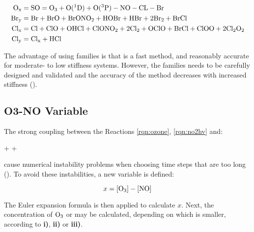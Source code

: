 \begin{align*}
    \mathrm{O_x} & = \mathrm{SO} = \mathrm{O_3} + \mathrm{O(^1D)} + \mathrm{O(^3P)} - \mathrm{NO} - \mathrm{CL} - \mathrm{Br} \\
    \mathrm{Br_y} & = \mathrm{Br} + \mathrm{BrO} + \mathrm{BrONO_2} + \mathrm{HOBr} + \mathrm{HBr} + 2\mathrm{Br_2} + \mathrm{BrCl} \\
    \mathrm{Cl_x} & = \mathrm{Cl} + \mathrm{ClO} + \mathrm{OHCl} + \mathrm{ClONO_2} + 2\mathrm{Cl_2} + \mathrm{OClO} + \mathrm{BrCl} + \mathrm{ClOO} + 2\mathrm{Cl_2O_2} \\
    \mathrm{Cl_y} & = \mathrm{Cl_x} + \mathrm{HCl}
\end{align*}

The advantage of using families is that is a fast method, and reasonably accurate for moderate- to low stiffness systems. However, the families needs to be carefully designed and validated and the accuracy of the method decreases with increased stiffness (\cite{AtmModFund}).


\subsection{O3-NO Variable}\label{sec:O3-NO}

The strong coupling between the Reactions \ref{rqn:ozone}, \ref{rqn:no2hv} and:

\begin{reaction}
     +  \rightarrow {} + 
    \label{rqn:o3no}
\end{reaction}

cause numerical instability problems when choosing time steps that are too long (\cite{Hesstvedt1978}). To avoid these instabilities, a new variable is defined: 

\begin{equation}
    x = [\mathrm{O_3}] - [\mathrm{NO}]
\end{equation}

The Euler expansion formula is then applied to calculate $x$. Next, the concentration of $\mathrm{O_3}$ or  may be calculated, depending on which is smaller, according to \textbf{i)}, \textbf{ii)} or \textbf{iii)}. 